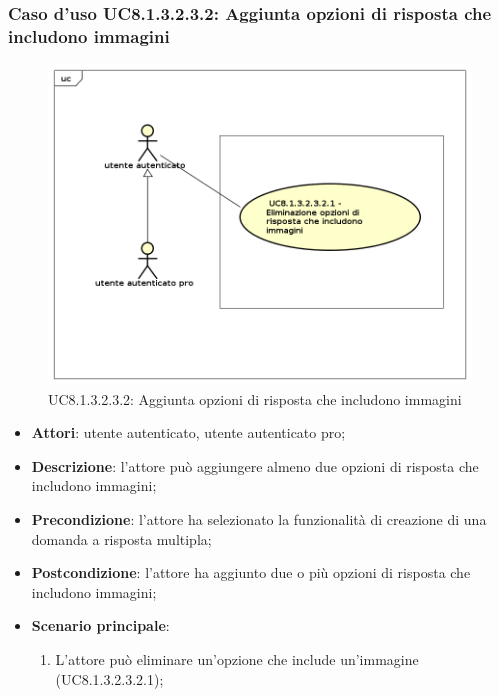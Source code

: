 \subsubsection{Caso d'uso UC8.1.3.2.3.2: Aggiunta opzioni di risposta che includono immagini}
	\label{UC8.1.3.2.3.2}
	\begin{figure}[h]
		\centering
			\includegraphics[scale=0.45,keepaspectratio]{UML/UC8_1_3_2_3_2.png}
		\caption{UC8.1.3.2.3.2:  Aggiunta opzioni di risposta che includono immagini}
	\end{figure}	
	\FloatBarrier
	\begin{itemize}
		\item
			\textbf{Attori}: utente autenticato, utente autenticato pro;
		\item		
			\textbf{Descrizione}: l'attore può aggiungere almeno due opzioni di risposta che includono immagini;
		\item
			\textbf{Precondizione}: l'attore ha selezionato la funzionalità di creazione di una domanda a risposta multipla;
		\item
			\textbf{Postcondizione}: l'attore ha aggiunto due o più opzioni di risposta che includono immagini;
		\item
			\textbf{Scenario principale}: 
				\begin{enumerate}
					\item
						L'attore può eliminare un'opzione che include un'immagine (UC8.1.3.2.3.2.1); 				
				\end{enumerate}
	\end{itemize}
	
